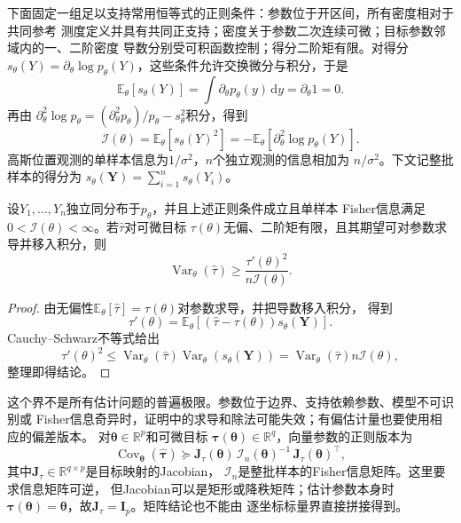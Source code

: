 下面固定一组足以支持常用恒等式的正则条件：参数位于开区间，所有密度相对于共同参考
测度定义并具有共同正支持；密度关于参数二次连续可微；目标参数邻域内的一、二阶密度
导数分别受可积函数控制；得分二阶矩有限。对得分
\(s_\theta(Y)=\partial_\theta\log p_\theta(Y)\)，这些条件允许交换微分与积分，于是
\[
  \mathbb{E}_\theta[s_\theta(Y)]
  =\int\partial_\theta p_\theta(y)\,\mathrm dy
  =\partial_\theta1=0.
\]
再由
\(\partial_\theta^2\log p_\theta
=(\partial_\theta^2p_\theta)/p_\theta-s_\theta^2\)积分，得到
\[
  \mathcal I(\theta)
  =\mathbb{E}_\theta[s_\theta(Y)^2]
  =-\mathbb{E}_\theta[\partial_\theta^2\log p_\theta(Y)].
\]
高斯位置观测的单样本信息为\(1/\sigma^2\)，\(n\)个独立观测的信息相加为
\(n/\sigma^2\)。下文记整批样本的得分为
\(s_\theta(\bm Y)=\sum_{i=1}^n s_\theta(Y_i)\)。

\begin{theorem}
\label{thm:statistics-cramer-rao}
设\(Y_1,\ldots,Y_n\)独立同分布于\(p_\theta\)，并且上述正则条件成立且单样本
Fisher信息满足\(0<\mathcal I(\theta)<\infty\)。若\(\widehat\tau\)对可微目标
\(\tau(\theta)\)无偏、二阶矩有限，且其期望可对参数求导并移入积分，则
\[
  \operatorname{Var}_\theta(\widehat\tau)
  \geq\frac{\tau'(\theta)^2}{n\mathcal I(\theta)}.
\]
\end{theorem}

\begin{proof}
由无偏性\(\mathbb{E}_\theta[\widehat\tau]=\tau(\theta)\)对参数求导，并把导数移入积分，
得到
\[
  \tau'(\theta)
  =\mathbb{E}_\theta[
    (\widehat\tau-\tau(\theta))s_\theta(\bm Y)].
\]
Cauchy--Schwarz不等式给出
\[
  \tau'(\theta)^2\leq
  \operatorname{Var}_\theta(\widehat\tau)
  \operatorname{Var}_\theta(s_\theta(\bm Y))
  =
  \operatorname{Var}_\theta(\widehat\tau)n\mathcal I(\theta),
\]
整理即得结论。
\end{proof}

这个界不是所有估计问题的普遍极限。参数位于边界、支持依赖参数、模型不可识别或
Fisher信息奇异时，证明中的求导和除法可能失效；有偏估计量也要使用相应的偏差版本。
对\(\bm\theta\in\mathbb{R}^p\)和可微目标
\(\bm\tau(\bm\theta)\in\mathbb{R}^q\)，向量参数的正则版本为
\[
  \operatorname{Cov}_{\bm\theta}(\widehat{\bm\tau})
  \succeq
  \bm J_\tau(\bm\theta)\,
  \bm{\mathcal I}_n(\bm\theta)^{-1}\,
  \bm J_\tau(\bm\theta)^\top,
\]
其中\(\bm J_\tau\in\mathbb{R}^{q\times p}\)是目标映射的Jacobian，
\(\bm{\mathcal I}_n\)是整批样本的Fisher信息矩阵。这里要求信息矩阵可逆，
但Jacobian可以是矩形或降秩矩阵；估计参数本身时
\(\bm\tau(\bm\theta)=\bm\theta\)，故\(\bm J_\tau=\bm I_p\)。矩阵结论也不能由
逐坐标标量界直接拼接得到。

